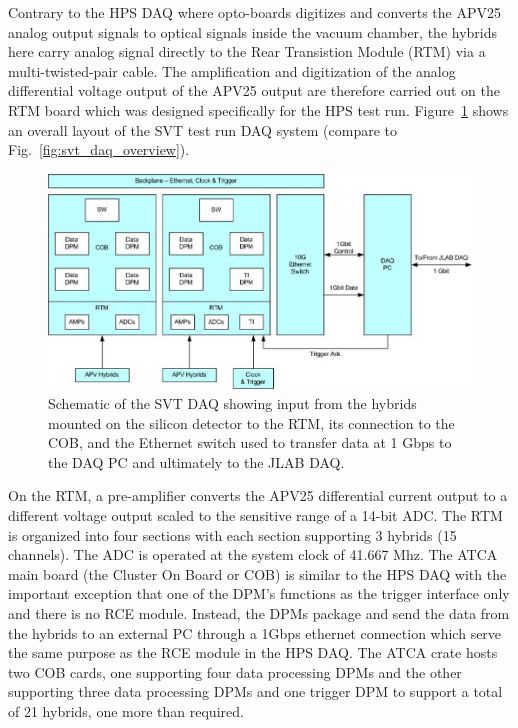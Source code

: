 Contrary to the HPS DAQ where opto-boards digitizes and converts the APV25 analog output signals to 
optical signals inside the vacuum chamber, the hybrids here carry analog signal directly to the 
Rear Transistion Module (RTM) via a multi-twisted-pair cable. The amplification and digitization of the 
analog differential voltage output of the APV25 output are therefore carried out on the RTM board 
which was designed specifically for the HPS test run. Figure~\ref{fig:svtdaq} shows an overall layout of 
the SVT test run DAQ system (compare to Fig.~\ref{fig:svt_daq_overview}).
 \begin{figure}[t]
\includegraphics[scale=0.9]{test2012/daq/svt_daq_diagram.png}
\caption{\small{Schematic of the SVT DAQ showing input from the hybrids mounted on the silicon detector to the RTM, its connection to the COB, and the Ethernet switch used to transfer data at 1 Gbps to the 
DAQ PC and ultimately to the JLAB DAQ.}}
\label{fig:svtdaq}
\end{figure}
On the RTM, a pre-amplifier converts the APV25 differential current output to a different voltage output 
scaled to the sensitive range of a 14-bit ADC. The RTM is organized into four sections with each section 
supporting 3 hybrids (15 channels). 
The ADC is operated at the system clock of 41.667 Mhz. 
The ATCA main board (the Cluster On Board or COB) is similar to the HPS DAQ with the important exception that one of the DPM's functions as the trigger interface only and there is no RCE module. 
Instead, the DPMs package and send the data from the hybrids to an external PC through a 1Gbps 
ethernet connection which serve the same purpose as the RCE module in the HPS DAQ. 
The ATCA crate hosts two COB cards, one supporting four data processing DPMs and the other supporting three data processing DPMs and one trigger DPM to support a total of 21 hybrids, one more than required. 
